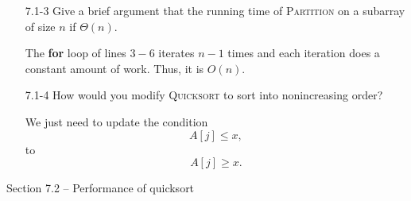 \documentclass{report}
\makeatletter
\renewenvironment{framed}{%
 \def\FrameCommand##1{\hskip\@totalleftmargin
 \fboxsep=\FrameSep\fbox{##1}}%
 \MakeFramed {\advance\hsize-\width
   \@totalleftmargin\z@ \linewidth\hsize
   \@setminipage}}%
 {\par\unskip\endMakeFramed}
\makeatother
\begin{document}
\begin{enumerate}
\item[7.1{-}3]{Give a brief argument that the running time of \textsc{Partition}
on a subarray of size $n$ if $\Theta(n)$.}

\begin{framed}
The \textbf{for} loop of lines $3{-}6$ iterates $n - 1$ times and each
iteration does a constant amount of work. Thus, it is $O(n)$.
\end{framed}

\item[7.1{-}4]{How would you modify \textsc{Quicksort} to sort into
nonincreasing order?}

\begin{framed}
We just need to update the condition
\[
  A[j] \le x,
\]
to
\[
  A[j] \ge x.
\]
\end{framed}

\end{enumerate}

\newpage

{\large Section 7.2 {--} Performance of quicksort}
\end{document}
